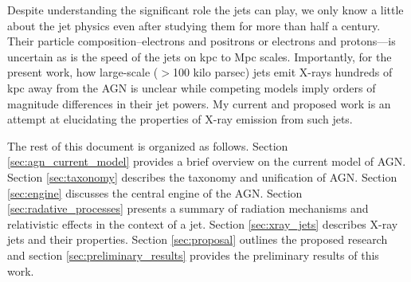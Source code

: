 Despite understanding the significant role the jets can play, we only know a little about the jet physics even after studying them for more than half a century. Their particle composition--electrons and positrons or electrons and protons---is uncertain as is the speed of the jets on kpc to Mpc scales. Importantly, for the present work,  how large-scale ($>$100 kilo parsec) jets emit X-rays hundreds of kpc away from the AGN is unclear while competing models imply orders of magnitude differences in their jet powers. My current and proposed work is an attempt at elucidating the properties of X-ray emission from such jets.

The rest of this document is organized as follows. Section \ref{sec:agn_current_model} provides a brief overview on the current model of AGN. Section \ref{sec:taxonomy}    describes the taxonomy and unification of AGN.  Section \ref{sec:engine} discusses the central engine of the AGN. Section \ref{sec:radative_processes} presents a summary of radiation mechanisms and relativistic effects in the context of a jet. Section  \ref{sec:xray_jets} describes X-ray jets and their properties. Section \ref{sec:proposal} outlines the proposed research and section \ref{sec:preliminary_results} provides the preliminary results of this work.
